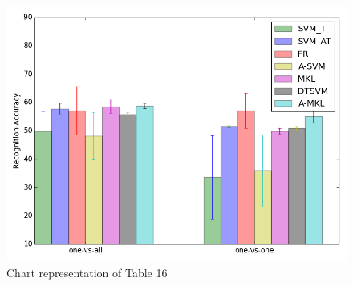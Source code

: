 \begin{table}[!ht]
  \begin{center}
    \end{center}
    \caption{Means and standard deviations (percent) of average recognition accuracies over six events for all methods using different SVM multi-class schemes}
\end{table}

\begin{figure}[!ht]
\centering
  \includegraphics[scale = 0.5]{./onevsone.png}
\caption{Chart representation of Table 16}
\end{figure}



